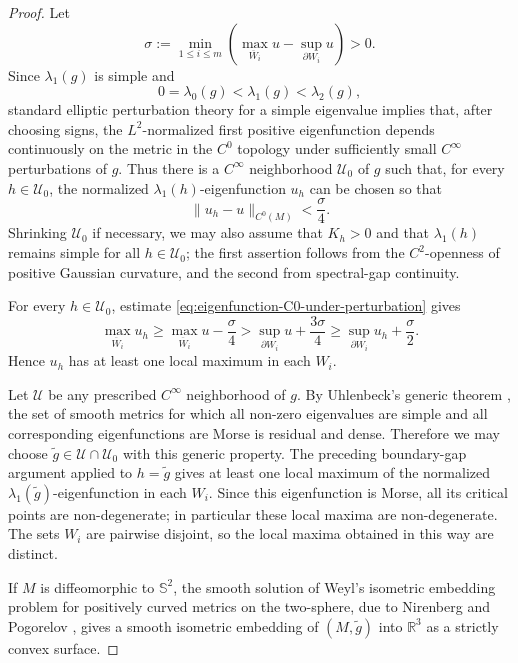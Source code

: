 \documentclass[11pt]{amsart}
\numberwithin{equation}{section}
\newcommand{\R}{\mathbb R}
\begin{document}
\begin{proof}
Let
$$
\sigma:=\min_{1\le i\le m}
\left(\max_{\overline W_i}u-\sup_{\partial W_i}u\right)>0.
$$
Since $\lambda_1(g)$ is simple and
$$
0=\lambda_0(g)<\lambda_1(g)<\lambda_2(g),
$$
standard elliptic perturbation theory for a simple eigenvalue implies that, after
choosing signs, the $L^2$-normalized first positive eigenfunction depends
continuously on the metric in the $C^0$ topology under sufficiently small
$C^\infty$ perturbations of $g$.  Thus there is a $C^\infty$ neighborhood
$\mathcal U_0$ of $g$ such that, for every $h\in\mathcal U_0$, the normalized
$\lambda_1(h)$-eigenfunction $u_h$ can be chosen so that
\begin{equation}\label{eq:eigenfunction-C0-under-perturbation}
\|u_h-u\|_{C^0(M)}<\frac{\sigma}{4}.
\end{equation}
Shrinking $\mathcal U_0$ if necessary, we may also assume that
$K_h>0$ and that $\lambda_1(h)$ remains simple for all $h\in\mathcal U_0$; the
first assertion follows from the $C^2$-openness of positive Gaussian curvature,
and the second from spectral-gap continuity.

For every $h\in\mathcal U_0$, estimate
\eqref{eq:eigenfunction-C0-under-perturbation} gives
$$
\max_{\overline W_i}u_h
\ge \max_{\overline W_i}u-\frac{\sigma}{4}
> \sup_{\partial W_i}u+\frac{3\sigma}{4}
\ge \sup_{\partial W_i}u_h+\frac{\sigma}{2}.
$$
Hence $u_h$ has at least one local maximum in each $W_i$.

Let $\mathcal U$ be any prescribed $C^\infty$ neighborhood of $g$.  By
Uhlenbeck's generic theorem \cite{Uhlenbeck1976}, the set of smooth metrics for
which all non-zero eigenvalues are simple and all corresponding eigenfunctions
are Morse is residual and dense.  Therefore we may choose
$\widetilde g\in\mathcal U\cap\mathcal U_0$ with this generic property.  The
preceding boundary-gap argument applied to $h=\widetilde g$ gives at least one
local maximum of the normalized $\lambda_1(\widetilde g)$-eigenfunction in each
$W_i$.  Since this eigenfunction is Morse, all its critical points are
non-degenerate; in particular these local maxima are non-degenerate.  The sets
$W_i$ are pairwise disjoint, so the local maxima obtained in this way are
distinct.

If $M$ is diffeomorphic to $\mathbb S^2$, the smooth solution of Weyl's isometric
embedding problem for positively curved metrics on the two-sphere, due to
Nirenberg and Pogorelov \cite{Nirenberg1953,Pogorelov1952}, gives a smooth
isometric embedding of $(M,\widetilde g)$ into $\R^3$ as a strictly convex
surface.
\end{proof}
\end{document}
